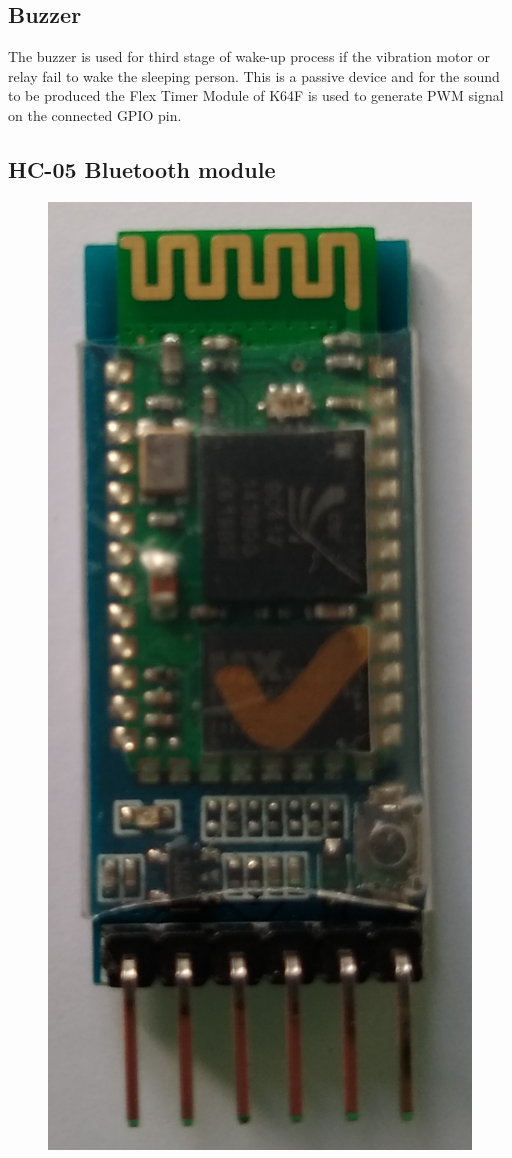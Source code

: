 \documentclass[12pt,a4paper]{article}
\begin{document}
		\subsection{Buzzer}
		The buzzer is used for third stage of wake-up process if the vibration motor or relay fail 
		to wake the sleeping person. This is a passive device and for the sound to be produced  
		the Flex Timer Module of K64F is used to generate PWM signal on the connected GPIO pin.
		
		\subsection{HC-05 Bluetooth module}
		
		\begin{figure}
			\centering
			\includegraphics[scale=0.06]{hc-05_1.jpg}

\end{figure}
\end{document}
